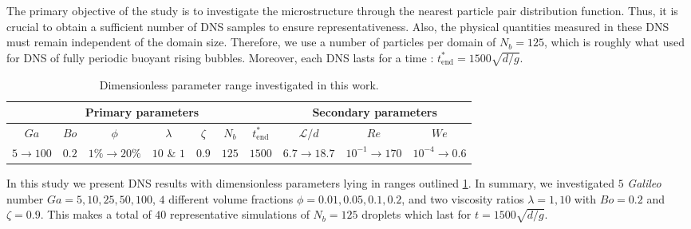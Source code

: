 The primary objective of the study is to investigate the microstructure through the nearest particle pair distribution function.
Thus, it is crucial to obtain a sufficient number of DNS samples to ensure representativeness. 
Also, the physical quantities measured in these DNS must remain independent of the domain size. 
Therefore, we use a number of particles per domain of $N_b = 125$, which is roughly what \citet{hidman2023assessing} used for DNS of fully periodic buoyant rising bubbles.
Moreover, each DNS lasts for a time : $t^*_\text{end} = 1500 \sqrt{d/g}$.
\begin{table}[h!]
    \centering
    \caption{Dimensionless parameter range investigated in this work.}
    \begin{tabular}{|ccccccc|ccc|}\hline
        \multicolumn{7}{|c|}{Primary parameters}&\multicolumn{3}{|c|}{Secondary parameters}\\\hline\hline
        $Ga$&$Bo$&$\phi$&$\lambda$&$\zeta$&$N_b$&$t^*_\text{end}$&$\mathcal{L}/d$&$Re$&$We$\\ \hline
        $5\rightarrow 100$&$0.2$&$1\% \rightarrow 20\%$&$10$ \& $1$&$0.9$&$125$&$1500$&$6.7\to 18.7$&$10^{-1}\to 170$&$10^{-4}\to 0.6$\\ \hline
    \end{tabular}
    \label{tab:simulations}
\end{table}
In this study we present DNS results with dimensionless parameters lying in ranges outlined \ref{tab:simulations}.
In summary, we investigated $5$ \textit{Galileo} number $Ga = 5,10,25,50,100$, $4$ different volume fractions $\phi = 0.01,0.05,0.1,0.2$, and two viscosity ratios $\lambda =1,10$ with $Bo = 0.2$ and $\zeta = 0.9$. 
This makes a total of $40$ representative simulations of $N_b = 125$ droplets which last for $t= 1500 \sqrt{d/g}$. 
